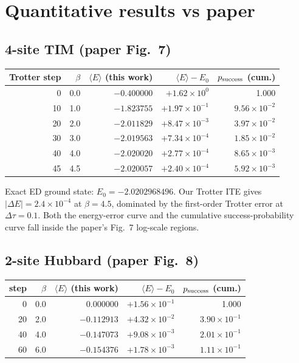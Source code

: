 \documentclass[11pt]{article}
\begin{document}
\section{Quantitative results vs paper}

\subsection{4-site TIM (paper Fig.~7)}

\begin{center}
\begin{tabular}{rrrrr}
\toprule
Trotter step & $\beta$ & $\langle E\rangle$ (this work) & $\langle E\rangle - E_0$ & $p_{\rm success}$ (cum.) \\
\midrule
 0  & 0.0 & $-0.400000$ & $+1.62\!\times\!10^{0}$  & 1.000 \\
10  & 1.0 & $-1.823755$ & $+1.97\!\times\!10^{-1}$ & $9.56\!\times\!10^{-2}$ \\
20  & 2.0 & $-2.011829$ & $+8.47\!\times\!10^{-3}$ & $3.97\!\times\!10^{-2}$ \\
30  & 3.0 & $-2.019563$ & $+7.34\!\times\!10^{-4}$ & $1.85\!\times\!10^{-2}$ \\
40  & 4.0 & $-2.020020$ & $+2.77\!\times\!10^{-4}$ & $8.65\!\times\!10^{-3}$ \\
45  & 4.5 & $-2.020057$ & $+2.40\!\times\!10^{-4}$ & $5.92\!\times\!10^{-3}$ \\
\bottomrule
\end{tabular}
\end{center}

Exact ED ground state: $E_0 = -2.0202968496$. Our Trotter ITE gives
$|\Delta E| = 2.4\!\times\!10^{-4}$ at $\beta = 4.5$, dominated by the first-order
Trotter error at $\Delta\tau = 0.1$. Both the energy-error curve and the
cumulative success-probability curve fall inside the paper's Fig.~7 log-scale
regions.

\subsection{2-site Hubbard (paper Fig.~8)}

\begin{center}
\begin{tabular}{rrrrr}
\toprule
step & $\beta$ & $\langle E\rangle$ (this work) & $\langle E\rangle - E_0$ & $p_{\rm success}$ (cum.) \\
\midrule
 0  & 0.0 & $\phantom{-}0.000000$ & $+1.56\!\times\!10^{-1}$ & 1.000 \\
20  & 2.0 & $-0.112913$          & $+4.32\!\times\!10^{-2}$ & $3.90\!\times\!10^{-1}$ \\
40  & 4.0 & $-0.147073$          & $+9.08\!\times\!10^{-3}$ & $2.01\!\times\!10^{-1}$ \\
60  & 6.0 & $-0.154376$          & $+1.78\!\times\!10^{-3}$ & $1.11\!\times\!10^{-1}$ \\
\bottomrule
\end{tabular}
\end{center}
\end{document}
